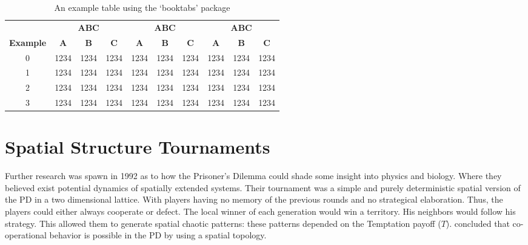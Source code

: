 \begin{table}[h]
\centering
\caption{An example table using the `booktabs' package}
\label{fig:exampletable}
\begin{tabular}{cccccccccc}
\toprule
& \multicolumn{3}{c}{\textbf{ABC}} & \multicolumn{3}{c}{\textbf{ABC}} & \multicolumn{3}{c}{\textbf{ABC}} \\
\cmidrule(lr){2-4}\cmidrule(lr){5-7}\cmidrule(lr){8-10}
\textbf{Example}      & \textbf{A}       & \textbf{B}       & \textbf{C}      & \textbf{A}           & \textbf{B}           & \textbf{C}          & \textbf{A}           & \textbf{B}           & \textbf{C}          \\
\cmidrule(lr){1-1}\cmidrule(lr){2-4}\cmidrule(lr){5-7}\cmidrule(lr){8-10}
0         & 1234      & 1234     & 1234     & 1234          & 1234         & 1234         & 1234        & 1234         & 1234         \\
1         & 1234      & 1234     & 1234     & 1234          & 1234         & 1234         & 1234        & 1234         & 1234         \\
2         & 1234      & 1234     & 1234     & 1234          & 1234         & 1234         & 1234        & 1234         & 1234        \\
3         & 1234      & 1234     & 1234     & 1234          & 1234         & 1234         & 1234        & 1234         & 1234         \\ \bottomrule
\end{tabular}
\end{table}


\section{Spatial Structure Tournaments}

Further research was spawn in 1992 as to how the Prisoner's Dilemma could shade
some insight into physics and biology. Where they believed exist potential
dynamics of spatially extended systems. Their tournament was a simple and purely
deterministic spatial version of the PD in a two dimensional lattice. With
players having no memory of the previous rounds and no strategical elaboration.
Thus, the players could either always cooperate or defect. The local winner of
each generation would win a territory. His neighbors would follow his strategy.
This allowed them to generate spatial chaotic patterns: these patterns depended
on the Temptation payoff (\(T\)). \cite{Nowak and May} concluded that co-operational
behavior is possible in the PD by using a spatial topology.

